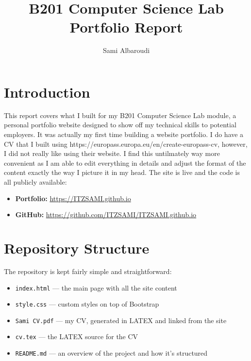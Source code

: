 \documentclass[12pt, a4paper]{article}
\title{\textbf{B201 Computer Science Lab} \\ Portfolio Report}
\author{Sami Albaroudi}
\date{}
\begin{document}
\maketitle

\section{Introduction}

This report covers what I built for my B201 Computer Science Lab module, a personal portfolio website designed to show off my technical skills to potential employers. It was actually my first time building a website portfolio. I do have a CV that I built using https://europass.europa.eu/en/create-europass-cv, however, I did not really like using their website. I find this untilmately way more convenient as I am able to edit everything in details and adjust the format of the content exactly the way I picture it in my head. The site is live and the code is all publicly available:

\begin{itemize}[noitemsep]
    \item \textbf{Portfolio:} \url{https://ITZSAMI.github.io}
    \item \textbf{GitHub:} \url{https://github.com/ITZSAMI/ITZSAMI.github.io}
\end{itemize}

\section{Repository Structure}

The repository is kept fairly simple and straightforward:

\begin{itemize}[noitemsep]
    \item \texttt{index.html} --- the main page with all the site content
    \item \texttt{style.css} --- custom styles on top of Bootstrap
    \item \texttt{Sami CV.pdf} --- my CV, generated in LATEX and linked from the site
    \item \texttt{cv.tex} --- the LATEX source for the CV
    \item \texttt{README.md} --- an overview of the project and how it's structured
\end{itemize}
\end{document}

